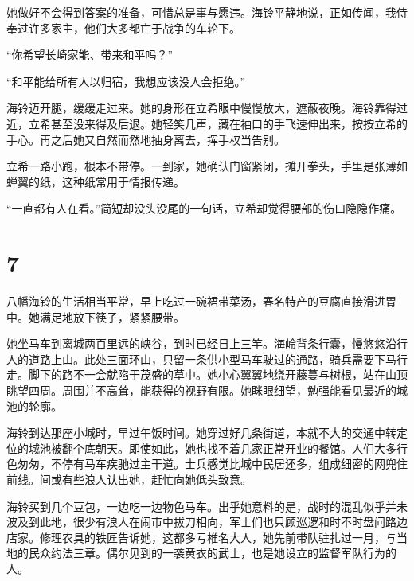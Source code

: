 \documentclass{article}
\begin{document}
她做好不会得到答案的准备，可惜总是事与愿违。海铃平静地说，正如传闻，我侍奉过许多家主，他们大多都亡于战争的车轮下。



“你希望长崎家能、带来和平吗？”



“和平能给所有人以归宿，我想应该没人会拒绝。”



海铃迈开腿，缓缓走过来。她的身形在立希眼中慢慢放大，遮蔽夜晚。海铃靠得过近，立希甚至没来得及后退。她轻笑几声，藏在袖口的手飞速伸出来，按按立希的手心。再之后她又自然而然地抽身离去，挥手权当告别。



立希一路小跑，根本不带停。一到家，她确认门窗紧闭，摊开拳头，手里是张薄如蝉翼的纸，这种纸常用于情报传递。



“一直都有人在看。”简短却没头没尾的一句话，立希却觉得腰部的伤口隐隐作痛。





{\centering\section*{7}}





八幡海铃的生活相当平常，早上吃过一碗裙带菜汤，春名特产的豆腐直接滑进胃中。她满足地放下筷子，紧紧腰带。



她坐马车到离城两百里远的峡谷，到时已经日上三竿。海岭背条行囊，慢悠悠沿行人的道路上山。此处三面环山，只留一条供小型马车驶过的通路，骑兵需要下马行走。脚下的路不一会就陷于茂盛的草中。她小心翼翼地绕开藤蔓与树根，站在山顶眺望四周。周围并不高耸，能获得的视野有限。她眯眼细望，勉强能看见最近的城池的轮廓。



海铃到达那座小城时，早过午饭时间。她穿过好几条街道，本就不大的交通中转定位的城池被翻个底朝天。即使如此，她也找不着几家正常开业的餐馆。人们大多行色匆匆，不停有马车疾驰过主干道。士兵感觉比城中民居还多，组成细密的网兜住前线。间或有些浪人认出她，赶忙向她低头致意。



海铃买到几个豆包，一边吃一边物色马车。出乎她意料的是，战时的混乱似乎并未波及到此地，很少有浪人在闹市中拔刀相向，军士们也只顾巡逻和时不时盘问路边店家。修理农具的铁匠告诉她，这都多亏椎名大人，她先前带队驻扎过一月，与当地的民众约法三章。偶尔见到的一袭黄衣的武士，也是她设立的监督军队行为的人。
\end{document}
